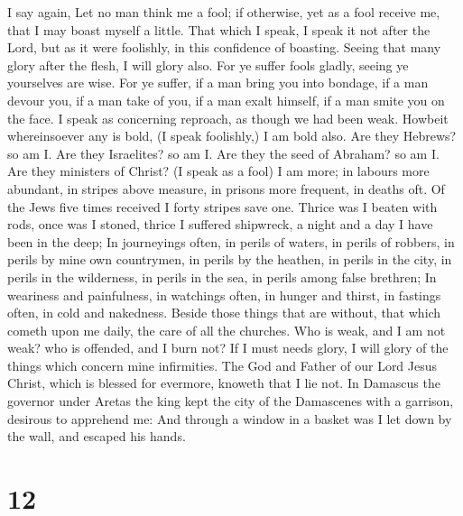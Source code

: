  I say again, Let no man think me a fool; if otherwise,
yet as a fool receive me, that I may boast myself a little.
 That which I speak, I speak it not after the Lord, but
as it were foolishly, in this confidence of boasting. 
Seeing that many glory after the flesh, I will glory also.
 For ye suffer fools gladly, seeing ye yourselves are
wise.  For ye suffer, if a man bring you into bondage, if
a man devour you, if a man take of you, if a man exalt himself, if a man
smite you on the face.  I speak as concerning reproach,
as though we had been weak. Howbeit whereinsoever any is bold, (I speak
foolishly,) I am bold also.  Are they Hebrews? so am I.
Are they Israelites? so am I. Are they the seed of Abraham? so am I.
 Are they ministers of Christ? (I speak as a fool) I am
more; in labours more abundant, in stripes above measure, in prisons
more frequent, in deaths oft.  Of the Jews five times
received I forty stripes save one.  Thrice was I beaten
with rods, once was I stoned, thrice I suffered shipwreck, a night and a
day I have been in the deep;  In journeyings often, in
perils of waters, in perils of robbers, in perils by mine own
countrymen, in perils by the heathen, in perils in the city, in perils
in the wilderness, in perils in the sea, in perils among false brethren;
 In weariness and painfulness, in watchings often, in
hunger and thirst, in fastings often, in cold and nakedness.
 Beside those things that are without, that which cometh
upon me daily, the care of all the churches.  Who is
weak, and I am not weak? who is offended, and I burn not?
 If I must needs glory, I will glory of the things which
concern mine infirmities.  The God and Father of our Lord
Jesus Christ, which is blessed for evermore, knoweth that I lie not.
 In Damascus the governor under Aretas the king kept the
city of the Damascenes with a garrison, desirous to apprehend me:
 And through a window in a basket was I let down by the
wall, and escaped his hands.

\hypertarget{section-11}{%
\section{12}\label{section-11}}

